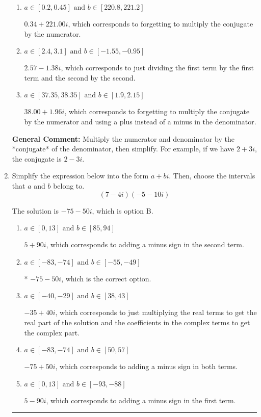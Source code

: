 \documentclass{extbook}[14pt]
\newcommand{\litem}[1]{\item #1

\rule{\textwidth}{0.4pt}}
\begin{document}
\begin{enumerate}
{\begin{enumerate}[label=\Alph*.]
* $0.34  + 1.96 i$, which is the correct option.
\item \( a \in [0.2, 0.45] \text{ and } b \in [220.8, 221.2] \)

 $0.34  + 221.00 i$, which corresponds to forgetting to multiply the conjugate by the numerator.
\item \( a \in [2.4, 3.1] \text{ and } b \in [-1.55, -0.95] \)

 $2.57  - 1.38 i$, which corresponds to just dividing the first term by the first term and the second by the second.
\item \( a \in [37.35, 38.35] \text{ and } b \in [1.9, 2.15] \)

 $38.00  + 1.96 i$, which corresponds to forgetting to multiply the conjugate by the numerator and using a plus instead of a minus in the denominator.
\end{enumerate}

\textbf{General Comment:} Multiply the numerator and denominator by the *conjugate* of the denominator, then simplify. For example, if we have $2+3i$, the conjugate is $2-3i$.
}
\litem{
Simplify the expression below into the form $a+bi$. Then, choose the intervals that $a$ and $b$ belong to.
\[ (7 - 4 i)(-5 - 10 i) \]

The solution is \( -75 - 50 i \), which is option B.\begin{enumerate}[label=\Alph*.]
\item \( a \in [0, 13] \text{ and } b \in [85, 94] \)

 $5 + 90 i$, which corresponds to adding a minus sign in the second term.
\item \( a \in [-83, -74] \text{ and } b \in [-55, -49] \)

* $-75 - 50 i$, which is the correct option.
\item \( a \in [-40, -29] \text{ and } b \in [38, 43] \)

 $-35 + 40 i$, which corresponds to just multiplying the real terms to get the real part of the solution and the coefficients in the complex terms to get the complex part.
\item \( a \in [-83, -74] \text{ and } b \in [50, 57] \)

 $-75 + 50 i$, which corresponds to adding a minus sign in both terms.
\item \( a \in [0, 13] \text{ and } b \in [-93, -88] \)

 $5 - 90 i$, which corresponds to adding a minus sign in the first term.
\end{enumerate}

}
\end{enumerate}
\end{document}

